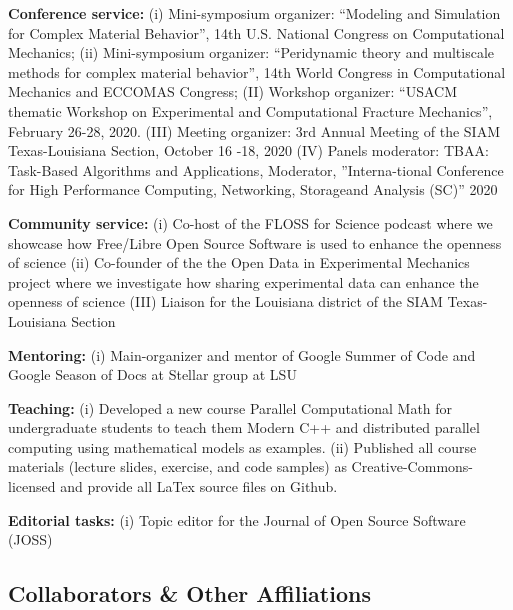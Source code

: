 \documentclass[svgnames,11pt]{article}
\begin{document}
\begin{bibenum}[itemsep=4pt]

    \item \textbf{Conference service:}
        (i) Mini-symposium organizer: ``Modeling and Simulation for Complex Material Behavior'', 14th U.S. National Congress on Computational Mechanics; (ii)  Mini-symposium organizer: ``Peridynamic theory and multiscale methods for complex material behavior'', 14th World Congress in Computational Mechanics and ECCOMAS Congress; (II) Workshop organizer: ``USACM thematic Workshop on Experimental and Computational Fracture Mechanics'', February 26-28, 2020. (III) Meeting organizer: 3rd Annual Meeting of the SIAM Texas-Louisiana Section, October 16 -18, 2020 (IV) Panels moderator: TBAA: Task-Based Algorithms and Applications, Moderator, ”Interna-tional Conference for High Performance Computing, Networking, Storageand Analysis (SC)” 2020

 

    \item \textbf{Community service:}
        (i) Co-host of the FLOSS for Science podcast where we showcase how Free/Libre Open Source Software is used to enhance the openness of science
        (ii) Co-founder of the the Open Data in Experimental Mechanics project where we investigate how sharing experimental data can enhance the openness of science
        (III) Liaison for the Louisiana district of the SIAM Texas-Louisiana Section


    \item \textbf{Mentoring:}
        (i) Main-organizer and mentor of Google Summer of Code and Google Season of Docs at Stellar group at LSU
    \item \textbf{Teaching:}
    (i) Developed a new course Parallel Computational Math for undergraduate students to teach them Modern C++ and distributed parallel computing using mathematical models as examples. (ii) Published all course materials (lecture slides, exercise, and code samples) as Creative-Commons-licensed and provide all LaTex source files on Github.   
    
    \item \textbf{Editorial tasks:}
    (i) Topic editor for the Journal of Open Source Software (JOSS)
\end{bibenum}

\subsection{Collaborators \& Other Affiliations}
\end{document}
